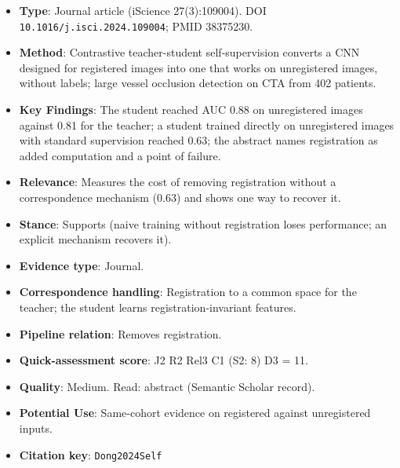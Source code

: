 \documentclass[journal,onecolumn]{IEEEtran}
\begin{document}
\begin{itemize}

\item{} \textbf{Type}: Journal article (iScience 27(3):109004). DOI \nolinkurl{10.1016/j.isci.2024.109004}; PMID 38375230.

\item{} \textbf{Method}: Contrastive teacher-student self-supervision converts a CNN designed for registered images into one that works on unregistered images, without labels; large vessel occlusion detection on CTA from 402 patients.

\item{} \textbf{Key Findings}: The student reached AUC 0.88 on unregistered images against 0.81 for the teacher; a student trained directly on unregistered images with standard supervision reached 0.63; the abstract names registration as added computation and a point of failure.

\item{} \textbf{Relevance}: Measures the cost of removing registration without a correspondence mechanism (0.63) and shows one way to recover it.

\item{} \textbf{Stance}: Supports (naive training without registration loses performance; an explicit mechanism recovers it).

\item{} \textbf{Evidence type}: Journal.

\item{} \textbf{Correspondence handling}: Registration to a common space for the teacher; the student learns registration-invariant features.

\item{} \textbf{Pipeline relation}: Removes registration.

\item{} \textbf{Quick-assessment score}: J2 R2 Rel3 C1 (S2: 8) D3 = 11.

\item{} \textbf{Quality}: Medium. Read: abstract (Semantic Scholar record).

\item{} \textbf{Potential Use}: Same-cohort evidence on registered against unregistered inputs.

\item{} \textbf{Citation key}: \texttt{Dong2024Self}

\end{itemize}
\end{document}
